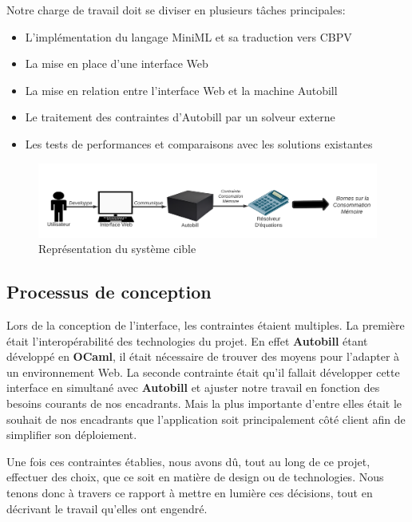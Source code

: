 \documentclass[12pt]{article}
\begin{document}
Notre charge de travail doit se diviser en plusieurs tâches principales:

\begin{itemize}
      \item
            L'implémentation du langage MiniML et sa traduction vers CBPV
      \item
            La mise en place d'une interface Web
      \item
            La mise en relation entre l'interface Web et la machine Autobill
      \item
            Le traitement des contraintes d'Autobill par un solveur externe
      \item
            Les tests de performances et comparaisons avec les solutions
            existantes
\end{itemize}

\begin{figure}
      \centering
      \includegraphics[scale=0.5]{Figures/DiagrammeHautNiveauPSTL.png}
      \caption{Représentation du système cible}
\end{figure}

\subsection{Processus de conception}\label{processus-de-conception}

Lors de la conception de l'interface, les contraintes étaient multiples.
La première était l'interopérabilité des technologies du projet. En
effet \textbf{Autobill} étant développé en \textbf{OCaml}, il était
nécessaire de trouver des moyens pour l'adapter à un environnement Web.
La seconde contrainte était qu'il fallait développer cette interface en simultané
avec \textbf{Autobill} et ajuster notre travail en fonction des besoins
courants de nos encadrants. Mais la plus importante d'entre elles était
le souhait de nos encadrants que l'application soit principalement côté
client afin de simplifier son déploiement.

Une fois ces contraintes établies, nous avons dû, tout au long de ce
projet, effectuer des choix, que ce soit en matière de design ou de
technologies. Nous tenons donc à travers ce rapport à mettre en lumière
ces décisions, tout en décrivant le travail qu'elles ont engendré.
\end{document}
